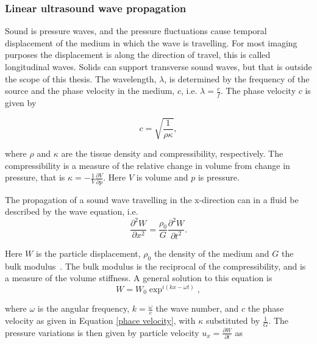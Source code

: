 \subsubsection{Linear ultrasound wave propagation}
Sound is pressure waves, and the pressure fluctuations cause temporal displacement of the medium in which the wave is travelling. For most imaging purposes the displacement is along the direction of travel, this is called longitudinal waves. Solids can support transverse sound waves, but that is outside the scope of this thesis.  The wavelength, $\lambda$, is determined by the frequency of the source and the phase velocity in the medium, $c$, i.e. $\lambda= \frac{c}{f}$. The phase velocity $c$ is given by

\begin{equation}
\label{phace velocity}
c = \sqrt{\frac{1}{\rho \kappa}},
\end{equation}

where $\rho$ and $\kappa$ are the tissue density and compressibility, respectively. %
The compressibility is a measure of the relative change in volume from change in pressure, that is $\kappa = -\frac{1}{V}\frac{\partial V}{\partial p}$. Here $V$ is volume and $p$ is pressure. 

The propagation of a sound wave travelling in the x-direction can in a fluid be described by the wave equation, i.e.
\begin{equation}
\label{wave equation}
\frac{\partial^2W}{\partial x^2} = \frac{\rho_0}{G}\frac{\partial^2W}{\partial t^2}.
\end{equation}

Here $W$ is the particle displacement, $\rho_0$ the density of the medium and $G$ the bulk modulus~\cite{Flower2012}. The bulk modulus is the reciprocal of the compressibility, and is a measure of the volume stiffness. A general solution to this equation is 
\begin{equation}
\label{particle displacement}
W = W_0 \exp^{i(kx - \omega t)},
\end{equation}

where $\omega$ is the angular frequency, $k = \frac{\omega}{c}$ the wave number, and $c$ the phase velocity as given in Equation \eqref{phace velocity}, with $\kappa$ substituted by $\frac{1}{G}$. The pressure variations is then given by particle velocity $u_x = \frac{\partial W}{\partial t}$ as 

